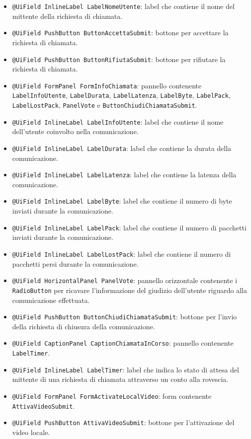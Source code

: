 {\begin{sloppypar}
{\begin{itemize}
\begin{itemize}
\begin{itemize}
					\item[] \texttt{@UiField InlineLabel LabelNomeUtente}: label che contiene il nome del mittente 
						della richiesta di chiamata.
					\item[] \texttt{@UiField PushButton ButtonAccettaSubmit}: bottone per accettare la richiesta 
						di chiamata.
					\item[] \texttt{@UiField PushButton ButtonRifiutaSubmit}: bottone per rifiutare la richiesta 
						di chiamata.
					\item[] \texttt{@UiField FormPanel FormInfoChiamata}: pannello contenente 
						\texttt{LabelInfoUtente}, \texttt{LabelDurata}, \texttt{LabelLatenza}, \texttt{LabelByte}, 
						\texttt{LabelPack}, \texttt{LabelLostPack}, \texttt{PanelVote} e \texttt{ButtonChiudiChiamataSubmit}.
					\item[] \texttt{@UiField InlineLabel LabelInfoUtente}: label che contiene il nome dell’utente 
						coinvolto nella comunicazione.
					\item[] \texttt{@UiField InlineLabel LabelDurata}: label che contiene la durata della 
						comunicazione.
					\item[] \texttt{@UiField InlineLabel LabelLatenza}: label che contiene la latenza della 
						comunicazione.
					\item[] \texttt{@UiField InlineLabel LabelByte}: label che contiene il numero di byte inviati 
						durante la comunicazione.
					\item[] \texttt{@UiField InlineLabel LabelPack}:  label che contiene il numero di pacchetti 
						inviati durante la comunicazione.
					\item[] \texttt{@UiField InlineLabel LabelLostPack}: label che contiene il numero di pacchetti 
						persi durante la comunicazione.
					\item[] \texttt{@UiField HorizontalPanel PanelVote}: pannello orizzontale contenente i 
						\texttt{RadioButton} per ricavare l’informazione del giudizio dell’utente riguardo alla 
						comunicazione effettuata.
					\item[] \texttt{@UiField PushButton ButtonChiudiChiamataSubmit}: bottone per l’invio della 
						richiesta di chiusura della comunicazione.
					\item[] \texttt{@UiField CaptionPanel CaptionChiamataInCorso}: pannello contenente \texttt{LabelTimer}.
					\item[] \texttt{@UiField InlineLabel LabelTimer}: label che indica lo stato di attesa del 
						mittente di una richiesta di chiamata attraverso un conto alla rovescia.
					\item[] \texttt{@UiField FormPanel FormActivateLocalVideo}: form contenente \texttt{AttivaVideoSubmit}.
					\item[] \texttt{@UiField PushButton AttivaVideoSubmit}: bottone per l’attivazione del video 
						locale.
				\end{itemize}


\end{itemize}
\end{itemize}}
\end{sloppypar}}
